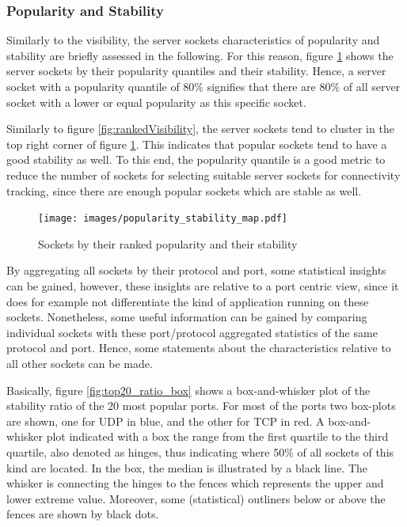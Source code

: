 \subsubsection{Popularity and Stability}

Similarly to the visibility, the \glspl{server socket} characteristics of popularity and stability are briefly assessed in the following. 
For this reason, figure \ref{fig:rankedPopularity} shows the \glspl{server socket} by their popularity quantiles and their stability. 
Hence, a \gls{server socket} with a popularity quantile of 80\% signifies that there are 80\% of all \gls{server socket} with a lower or equal popularity as this specific socket.

Similarly to figure \ref{fig:rankedVisibility}, the \glspl{server socket} tend to cluster in the top right corner of figure \ref{fig:rankedPopularity}. This indicates that popular sockets tend to have a good stability as well.
To this end, the popularity quantile is a good metric to reduce the number of sockets for selecting suitable server sockets for connectivity tracking, since there are enough popular sockets which are stable as well. 
\begin{figure}
	[ht] \centering 
	\texttt{[image: images/popularity\_stability\_map.pdf]} \caption{Sockets by their ranked popularity and their stability} 
	\label{fig:rankedPopularity} 
\end{figure}

By aggregating all sockets by their protocol and port, some statistical insights can be gained, however, these insights are relative to a port centric view, since it does for example not differentiate the kind of application running on these sockets. 
Nonetheless, some useful information can be gained by comparing individual sockets with these port/protocol aggregated statistics of the same protocol and port. 
Hence, some statements about the characteristics relative to all other sockets can be made.

Basically, figure \ref{fig:top20_ratio_box} shows a box-and-whisker plot of the stability ratio of the 20 most popular ports. 
For most of the ports two box-plots are shown, one for \gls{UDP} in blue, and the other for \gls{TCP} in red. 
A box-and-whisker plot indicated with a box the range from the first quartile to the third quartile, also denoted as hinges, thus indicating where 50\% of all sockets of this kind are located. 
In the box, the median is illustrated by a black line. 
The whisker is connecting the hinges to the fences which represents the upper and lower extreme value. 
Moreover, some (statistical) outliners below or above the fences are shown by black dots. 

